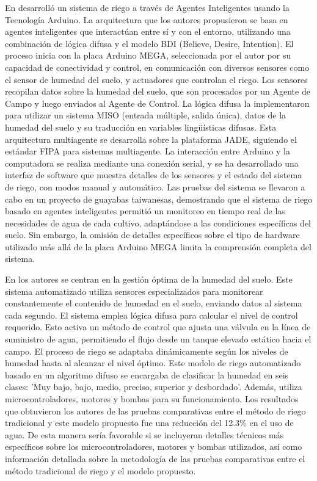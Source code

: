 \bigbreak
En \cite{salazar_irrigation_2013} desarrolló un sistema de riego a través de Agentes Inteligentes usando la Tecnología Arduino. La arquitectura que los autores propusieron se basa en agentes inteligentes que interactúan entre sí y con el entorno, utilizando una combinación de lógica difusa y el modelo BDI (Believe, Desire, Intention). El proceso inicia con la placa Arduino MEGA, seleccionada por el autor por su capacidad de conectividad y control, en comunicación con diversos sensores como el sensor de humedad del suelo, y actuadores que controlan el riego. Los sensores recopilan datos sobre la humedad del suelo, que son procesados por un Agente de Campo y luego enviados al Agente de Control. La lógica difusa la implementaron para utilizar un sistema MISO (entrada múltiple, salida única), datos de la humedad del suelo y su traducción en variables lingüísticas difusas. Esta arquitectura multiagente se desarrolla sobre la plataforma JADE, siguiendo el estándar FIPA para sistemas multiagente. La interacción entre Arduino y la computadora se realiza mediante una conexión serial, y se ha desarrollado una interfaz de software que muestra detalles de los sensores y el estado del sistema de riego, con modos manual y automático. Las pruebas del sistema se llevaron a cabo en un proyecto de guayabas taiwanesas, demostrando que el sistema de riego basado en agentes inteligentes permitió un monitoreo en tiempo real de las necesidades de agua de cada cultivo, adaptándose a las condiciones específicas del suelo. Sin embargo, la omisión de detalles específicos sobre el tipo de hardware utilizado más allá de la placa Arduino MEGA limita la comprensión completa del sistema.

\bigbreak
En \cite{hasan_implementation_2018} los autores se centran en la gestión óptima de la humedad del suelo. Este sistema automatizado utiliza sensores especializados para monitorear constantemente el contenido de humedad en el suelo, enviando datos al sistema cada segundo. El sistema emplea lógica difusa para calcular el nivel de control requerido. Esto activa un método de control que ajusta una válvula en la línea de suministro de agua, permitiendo el flujo desde un tanque elevado estático hacia el campo. El proceso de riego se adaptaba dinámicamente según los niveles de humedad hasta al alcanzar el nivel óptimo. Este modelo de riego automatizado basado en un algoritmo difuso se encargaba de clasificar la humedad en seis clases: 'Muy bajo, bajo, medio, preciso, superior y desbordado'. Además, utiliza microcontroladores, motores y bombas para su funcionamiento. Los resultados que obtuvieron los autores de las pruebas comparativas entre el método de riego tradicional y este modelo propuesto fue una reducción del 12.3\% en el uso de agua. De esta manera sería favorable si se incluyeran detalles técnicos más específicos sobre los microcontroladores, motores y bombas utilizados, así como información detallada sobre la metodología de las pruebas comparativas entre el método tradicional de riego y el modelo propuesto.

